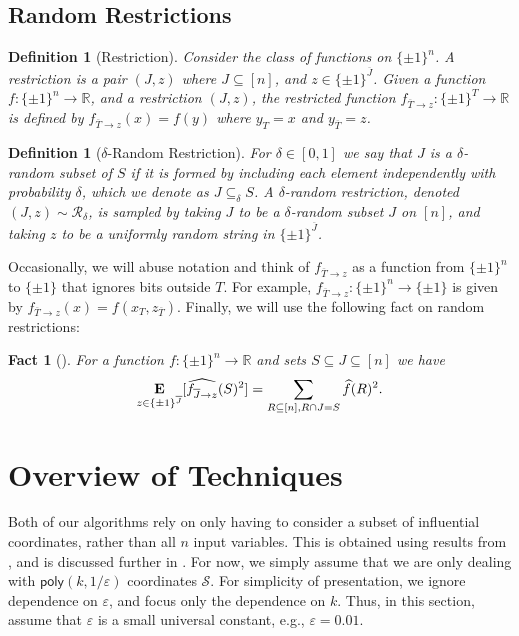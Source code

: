 \documentclass[10pt,a4paper]{article}
\providecommand{\poly}{\mathsf{poly}}
\theoremstyle{plain}
\newtheorem{fact}[theorem]{Fact}
\newtheorem{definition}[theorem]{Definition}
\theoremstyle{remark}
\theoremstyle{plain}
\providecommand{\R}{}
\renewcommand{\R}{\mathbb{R}}
\providecommand{\E}{}
\renewcommand{\E}{\mathop{\bf E\/}}
\newcommand{\eps}{\varepsilon}
\renewcommand{\hat}{\widehat}
\newcommand{\pmone}{\{\pm 1\}}
\newcommand{\calR}{\mathcal{R}}
\newcommand{\calS}{\mathcal{S}}
\newcommand{\InfluentialCoords}{\calS}
\begin{document}
\subsection{Random Restrictions}

%
\begin{definition}[Restriction]
\label{function-restriction}
Consider the class of  functions on $\pmone^n$.
A restriction is a pair $(J, z)$ where $J \subseteq[n]$, and $z \in \pmone^{\overline{J}}$.
Given a function $f:\pmone^n \to \mathbb{R}$, and a  restriction $(J,z)$, the {\sf restricted function} $f_{\overline{T} \to z}: \{\pm 1\}^{T} \to \mathbb R$ is defined by $f_{\overline{T} \to z}(x) = f(y)$ where $y_T = x$ and $y_{\overline{T}} = z$.
\end{definition}
\begin{definition}[$\delta$-Random Restriction]
\label{definition:random-restriction}
For $\delta \in [0,1]$ we say that $J$ is a {\sf $\delta$-random subset} of $S$ if it is formed by including each element independently with probability $\delta$, which we denote as $J \subseteq_\delta S$. 
A $\delta$-random restriction, denoted $(J,z) \sim \calR_\delta$, is sampled by taking $J$ to be a $\delta$-random subset $J$ on $[n]$, and taking $z$ to be a  uniformly random string in $\pmone^{\overline{J}}$.\end{definition}

%
%
%

Occasionally, we will abuse notation and think of $f_{\overline{T} \to z}$ as a function from $\pmone^n$ to $\pmone$ that ignores bits outside $T$. For example, $f_{\overline{T} \to z}: \pmone^n \to \pmone$ is given by $f_{\overline{T} \to z}(x) = f(x_T, z_{\overline{T}})$. Finally, we will use the following fact on random restrictions:

\begin{fact}[]
\label{fact:expected_square}
For a function $f: \pmone^n \to \R$ and sets $S\subseteq J \subseteq [n]$ we have 
$$
\E_{z \in \pmone^{\overline{J}}}[\hat{f_{\overline{J} \to z}}(S)^2] = \sum_{\substack{R \subseteq [n] ,  R\cap J= S}} \hat{f}(R)^2.
$$
\end{fact}





%
\section{Overview of Techniques}
\label{section:techniques}
Both of our algorithms rely on only having to consider a subset of influential coordinates, rather than all $n$ input variables. This is obtained using results from \cite{junta-coordinate-oracles}, and is discussed further in . For now, we simply assume that we are only dealing with $\poly(k,1/\eps)$ coordinates $\InfluentialCoords$. 
For  simplicity of presentation, we ignore dependence  on $\eps$, and focus only the dependence on $k$.  Thus, in this section, assume that $\eps$ is a small universal constant, e.g., $\eps = 0.01$.
\end{document}
